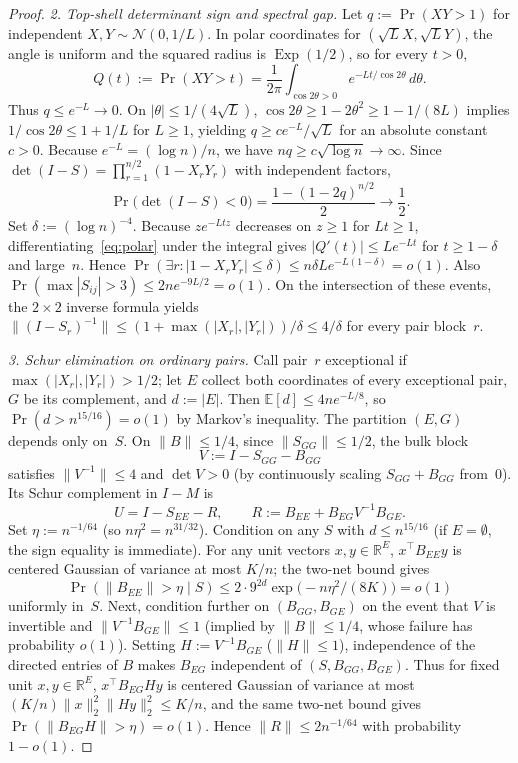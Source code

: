 \documentclass[11pt]{article}
\theoremstyle{plain}
\theoremstyle{definition}
\theoremstyle{remark}
\DeclareMathOperator{\Exp}{Exp}
\begin{document}
\begin{proof}
\emph{2. Top-shell determinant sign and spectral gap.}
Let $q := \Pr(XY > 1)$ for independent $X, Y \sim \mathcal{N}(0, 1/L)$. In polar coordinates for $(\sqrt{L} X, \sqrt{L} Y)$, the angle is uniform and the squared radius is $\Exp(1/2)$, so for every $t > 0$,
\begin{equation}\label{eq:polar}
Q(t) := \Pr(XY > t) = \frac{1}{2\pi} \int_{\cos 2\theta > 0} e^{-Lt / \cos 2\theta}\,d\theta.
\end{equation}
Thus $q \le e^{-L} \to 0$. On $|\theta| \le 1/(4\sqrt{L})$, $\cos 2\theta \ge 1 - 2\theta^2 \ge 1 - 1/(8L)$ implies $1/\cos 2\theta \le 1 + 1/L$ for $L \ge 1$, yielding $q \ge c e^{-L}/\sqrt{L}$ for an absolute constant $c > 0$. Because $e^{-L} = (\log n)/n$, we have $nq \ge c\sqrt{\log n} \to \infty$. Since $\det(I - S) = \prod_{r=1}^{n/2}(1 - X_r Y_r)$ with independent factors,
\begin{equation}\label{eq:sign-S}
\Pr\bigl(\det(I - S) < 0\bigr) = \frac{1 - (1 - 2q)^{n/2}}{2} \longrightarrow \frac{1}{2}.
\end{equation}
Set $\delta := (\log n)^{-4}$. Because $z e^{-Ltz}$ decreases on $z \ge 1$ for $Lt \ge 1$, differentiating~\eqref{eq:polar} under the integral gives $|Q'(t)| \le L e^{-Lt}$ for $t \ge 1 - \delta$ and large~$n$. Hence $\Pr(\exists r : |1 - X_r Y_r| \le \delta) \le n \delta L e^{-L(1 - \delta)} = o(1)$. Also $\Pr(\max |S_{ij}| > 3) \le 2n e^{-9L/2} = o(1)$. On the intersection of these events, the $2 \times 2$ inverse formula yields $\|(I - S_r)^{-1}\| \le (1 + \max(|X_r|, |Y_r|))/\delta \le 4/\delta$ for every pair block~$r$.

\emph{3. Schur elimination on ordinary pairs.}
Call pair~$r$ exceptional if $\max(|X_r|, |Y_r|) > 1/2$; let $E$ collect both coordinates of every exceptional pair, $G$ be its complement, and $d := |E|$. Then $\mathbb{E}[d] \le 4n e^{-L/8}$, so $\Pr(d > n^{15/16}) = o(1)$ by Markov's inequality. The partition $(E, G)$ depends only on~$S$. On $\|B\| \le 1/4$, since $\|S_{GG}\| \le 1/2$, the bulk block
\[
V := I - S_{GG} - B_{GG}
\]
satisfies $\|V^{-1}\| \le 4$ and $\det V > 0$ (by continuously scaling $S_{GG} + B_{GG}$ from~$0$). Its Schur complement in $I - M$ is
\[
U = I - S_{EE} - R, \qquad R := B_{EE} + B_{EG} V^{-1} B_{GE}.
\]
Set $\eta := n^{-1/64}$ (so $n\eta^2 = n^{31/32}$). Condition on any $S$ with $d \le n^{15/16}$ (if $E = \emptyset$, the sign equality is immediate). For any unit vectors $x, y \in \mathbb{R}^E$, $x^\top B_{EE} y$ is centered Gaussian of variance at most $K/n$; the two-net bound gives
\[
\Pr(\|B_{EE}\| > \eta \mid S) \le 2 \cdot 9^{2d} \exp\bigl(-n\eta^2 / (8K)\bigr) = o(1)
\]
uniformly in~$S$. Next, condition further on $(B_{GG}, B_{GE})$ on the event that $V$ is invertible and $\|V^{-1} B_{GE}\| \le 1$ (implied by $\|B\| \le 1/4$, whose failure has probability $o(1)$). Setting $H := V^{-1} B_{GE}$ ($\|H\| \le 1$), independence of the directed entries of $B$ makes $B_{EG}$ independent of $(S, B_{GG}, B_{GE})$. Thus for fixed unit $x, y \in \mathbb{R}^E$, $x^\top B_{EG} H y$ is centered Gaussian of variance at most $(K/n)\|x\|_2^2 \|Hy\|_2^2 \le K/n$, and the same two-net bound gives $\Pr(\|B_{EG} H\| > \eta) = o(1)$. Hence $\|R\| \le 2n^{-1/64}$ with probability $1 - o(1)$.


\end{proof}
\end{document}
